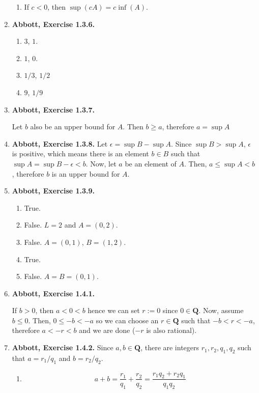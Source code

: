 \documentclass{article}
\newcommand{\Q}{\mathbf{Q}}
\newcommand{\exc}[2][Abbott]{\item \textbf{#1, Exercise #2.}}
\begin{document}
\begin{enumerate}
\begin{enumerate}
		\item If $c < 0$, then $\sup(c A) = c\inf(A)$.
	\end{enumerate}
				      	      
	\exc{1.3.6}
				      	      
	\begin{enumerate}
		\item $3$, $1$.
		\item $1$, $0$.
		\item $1/3$, $1/2$
		\item $9$, $1/9$
	\end{enumerate}
				      	      
	\exc{1.3.7}
				      	      
	Let $b$ also be an upper bound for $A$. Then $b \geq a$, therefore $a = \sup A$
				      	      
	\exc{1.3.8}
	Let $\epsilon = \sup B - \sup A$. Since $\sup B > \sup A$, $\epsilon$ is positive, which means there is an element $b \in B$ such that $\sup A = \sup B - \epsilon < b$. Now, let $a$ be an element of $A$. Then, $a \leq \sup A < b$, therefore $b$ is an upper bound for $A$.
				      	      
	\exc{1.3.9}
	\begin{enumerate}
		\item True.
		\item False. $L = 2$ and $A = (0, 2)$.
		\item False. $A = (0, 1)$, $B = (1, 2).$
		\item True.
		\item False. $A = B = (0, 1).$
	\end{enumerate}
				      	       
	\exc{1.4.1}
				      	       
	If $b > 0$, then $a < 0 < b$ hence we can set $r := 0$ since $0 \in \Q$. Now, assume $b \leq 0$. Then, $0 \leq -b < -a$ so we can choose an $r \in \Q$ such that $-b < r < -a$, therefore $a < -r < b$ and we are done ($-r$ is also rational). 
				      	       
	\exc{1.4.2}
	Since $a,b \in \Q$, there are integers $r_1, r_2, q_1,q_2$ such that $a = r_1/q_1$ and $b = r_2/q_2$.
				      	        
	\begin{enumerate}
		\item \begin{equation*}
		      a + b = \frac{r_1}{q_1} + \frac{r_2}{q_2} = \frac{r_1 q_2 + r_2 q_1}{q_1 q_2} 
		\end{equation*}
							      		      	      

\end{enumerate}
\end{enumerate}
\end{document}
